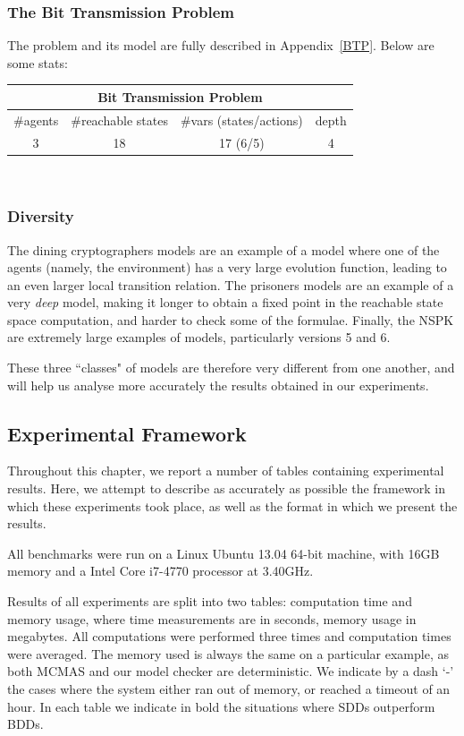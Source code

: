 \documentclass[11pt]{report}
\begin{document}
\subsubsection{The Bit Transmission Problem}
The problem and its model are fully described in Appendix~\ref{BTP}. Below are some stats: \\

{\centering
\begin{tabular}{*{4}{c}}
\hline
\hline
\multicolumn{4}{c}{\textbf{Bit Transmission Problem}}\\ \hline
\#agents & \#reachable states & \#vars (states/actions) & depth \\\hline
3 & 18 & 17 (6/5) & 4 \\
\hline
\end{tabular}
\\}

\subsubsection{Diversity}

The dining cryptographers models are an example of a model where one of the agents (namely, the environment) has a very large evolution function, leading to an even larger local transition relation. The prisoners models are an example of a very \textit{deep} model, making it longer to obtain a fixed point in the reachable state space computation, and harder to check some of the formulae.
Finally, the NSPK are extremely large examples of models, particularly versions 5 and 6. 

These three ``classes" of models are therefore very different from one another, and will help us analyse more accurately the results obtained in our experiments. 


\subsection{Experimental Framework} 

Throughout this chapter, we report a number of tables containing experimental results. Here, we attempt to describe as accurately as possible the framework in which these experiments took place, as well as the format in which we present the results. 

All benchmarks were run on a Linux Ubuntu 13.04 64-bit machine, with 16GB memory and a Intel Core i7-4770 processor at 3.40GHz. 

Results of all experiments are split into two tables: computation time and memory usage, where time measurements are in seconds, memory usage in megabytes. All computations were performed three times and computation times were averaged. The memory used is always the same on a particular example, as both MCMAS and our model checker are deterministic. We indicate by a dash `-' the cases where the system either ran out of memory, or reached a timeout of an hour. In each table we indicate in bold the situations where SDDs outperform BDDs.
\end{document}
